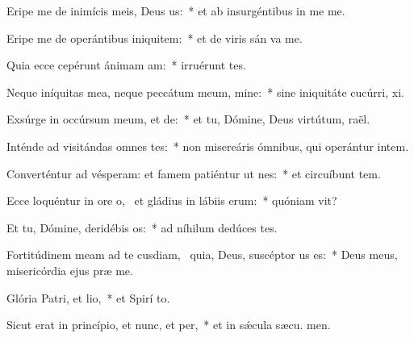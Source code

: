 \item Eripe me de inimícis meis, Deus us:~* et ab insurgéntibus in me  me.
\item Eripe me de operántibus iniquitem:~* et de viris sán va me.
\item Quia ecce cepérunt ánimam am:~* irruérunt   tes.
\item Neque iníquitas mea, neque peccátum meum, mine:~* sine iniquitáte cucúrri,  xi.
\item Exsúrge in occúrsum meum, et de:~* et tu, Dómine, Deus virtútum,  raël.
\item Inténde ad visitándas omnes tes:~* non misereáris ómnibus, qui operántur intem.
\item Converténtur ad vésperam: et famem patiéntur ut nes:~* et circuíbunt tem.
\item Ecce loquéntur in ore o,~\pscross{} et gládius in lábiis erum:~* quóniam  vit?
\item Et tu, Dómine, deridébis os:~* ad níhilum dedúces  tes.
\item Fortitúdinem meam ad te cusdiam,~\pscross{} quia, Deus, suscéptor us es:~* Deus meus, misericórdia ejus præ me.
\item Glória Patri, et lio,~* et Spirí to.
\item Sicut erat in princípio, et nunc, et per,~* et in sǽcula sæcu. men.
